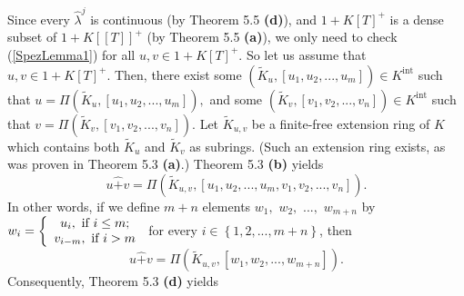 \documentclass[12pt,final,notitlepage,onecolumn,german]{article}%
\begin{document}
Since every $\widehat{\lambda}^{j}$ is continuous (by Theorem 5.5
\textbf{(d)}), and $1+K\left[  T\right]  ^{+}$ is a dense subset of
$1+K\left[  \left[  T\right]  \right]  ^{+}$ (by Theorem 5.5 \textbf{(a)}), we
only need to check (\ref{SpezLemma1}) for all $u,v\in1+K\left[  T\right]
^{+}$. So let us assume that $u,v\in1+K\left[  T\right]  ^{+}$. Then, there
exist some $\left(  \widetilde{K}_{u},\left[  u_{1},u_{2},...,u_{m}\right]
\right)  \in K^{\operatorname*{int}}$ such that $u=\Pi\left(  \widetilde
{K}_{u},\left[  u_{1},u_{2},...,u_{m}\right]  \right)  ,$ and some $\left(
\widetilde{K}_{v},\left[  v_{1},v_{2},...,v_{n}\right]  \right)  \in
K^{\operatorname*{int}}$ such that $v=\Pi\left(  \widetilde{K}_{v},\left[
v_{1},v_{2},...,v_{n}\right]  \right)  $. Let $\widetilde{K}_{u,v}$ be a
finite-free extension ring of $K$ which contains both $\widetilde{K}_{u}$ and
$\widetilde{K}_{v}$ as subrings. (Such an extension ring exists, as was proven
in Theorem 5.3 \textbf{(a)}.) Theorem 5.3 \textbf{(b)} yields%
\[
u\widehat{+}v=\Pi\left(  \widetilde{K}_{u,v},\left[  u_{1},u_{2}%
,...,u_{m},v_{1},v_{2},...,v_{n}\right]  \right)  .
\]
In other words, if we define $m+n$ elements $w_{1},$ $w_{2},$ $...,$ $w_{m+n}$
by $w_{i}=\left\{
\begin{array}
[c]{c}%
u_{i},\text{ if }i\leq m;\\
v_{i-m},\text{ if }i>m
\end{array}
\right.  $ for every $i\in\left\{  1,2,...,m+n\right\}  $, then%
\[
u\widehat{+}v=\Pi\left(  \widetilde{K}_{u,v},\left[  w_{1},w_{2}%
,...,w_{m+n}\right]  \right)  .
\]
Consequently, Theorem 5.3 \textbf{(d)} yields%
\end{document}
